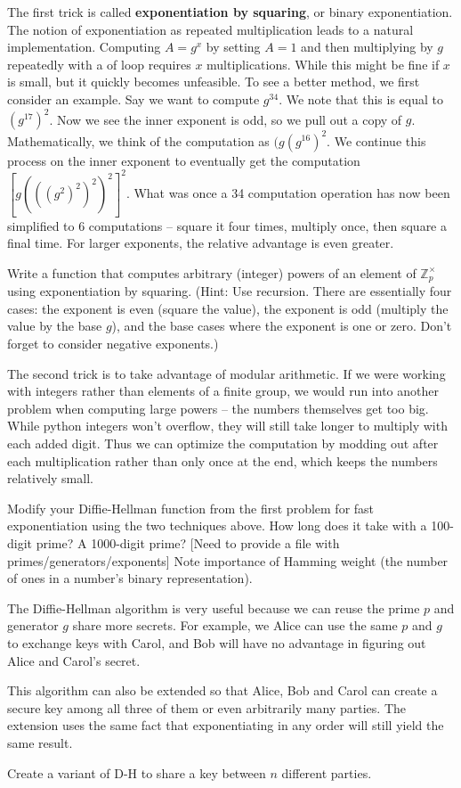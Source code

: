 The first trick is called {\bf exponentiation by squaring}, or binary exponentiation. The notion of exponentiation as repeated multiplication leads to a natural implementation. Computing $A = g^x$ by setting $A=1$ and then multiplying by $g$ repeatedly with a of loop requires $x$ multiplications. While this might be fine if $x$ is small, but it quickly becomes unfeasible. To see a better method, we first consider an example. Say we want to compute $g^{34}$. We note that this is equal to $(g^{17})^2$. Now we see the inner exponent is odd, so we pull out a copy of $g$.  Mathematically, we think of the computation as $(g(g^{16})^2$. We continue this process on the inner exponent to eventually get the computation $[g(((g^2)^2)^2)^2]^2$. What was once a 34 computation operation has now been simplified to 6 computations -- square it four times, multiply once, then square a final time. For larger exponents, the relative advantage is even greater.

\begin{problem}
Write a function that computes arbitrary (integer) powers of an element of $\mathbb{Z}_p^\times$ using exponentiation by squaring. (Hint: Use recursion. There are essentially four cases: the exponent is even (square the value), the exponent is odd (multiply the value by the base $g$), and the base cases where the exponent is one or zero. Don't forget to consider negative exponents.)
\end{problem}

The second trick is to take advantage of modular arithmetic. If we were working with integers rather than elements of a finite group, we would run into another problem when computing large powers -- the numbers themselves get too big. While python integers won't overflow, they will still take longer to multiply with each added digit. Thus we can optimize the computation by modding out after each multiplication rather than only once at the end, which keeps the numbers relatively small.

\begin{problem}
Modify your Diffie-Hellman function from the first problem for fast exponentiation using the two techniques above. How long does it take with a 100-digit prime? A 1000-digit prime? [Need to provide a file with primes/generators/exponents] Note importance of Hamming weight (the number of ones in a number's binary representation).
\end{problem}

The Diffie-Hellman algorithm is very useful because we can reuse the prime $p$ and generator $g$ share more secrets. For example, we Alice can use the same $p$ and $g$ to exchange keys with Carol, and Bob will have no advantage in figuring out Alice and Carol's secret.

This algorithm can also be extended so that Alice, Bob and Carol can create a secure key among all three of them or even arbitrarily many parties. The extension uses the same fact that exponentiating in any order will still yield the same result.

\begin{problem}
Create a variant of D-H to share a key between $n$ different parties.
\end{problem}

